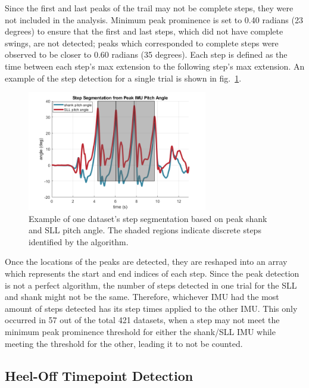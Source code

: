 \documentclass[defaultstyle,11pt]{comps}
\begin{document}
Since the first and last peaks of the trail may not be complete steps, they were not included in the analysis.
Minimum peak prominence is set to 0.40 radians (23 degrees) to ensure that the first and last steps, which did not have complete swings, are not detected; peaks which corresponded to complete steps were observed to be closer to 0.60 radians (35 degrees).
Each step is defined as the time between each step's max extension to the following step's max extension.
An example of the step detection for a single trial is shown in fig.~\ref{fig:SA1-Steps}.

\begin{figure}
\hypertarget{fig:SA1-Steps}{%
\centering
\includegraphics[width=0.7\textwidth,height=\textheight]{../fig/SA1/S3C1T1R_StepSeg.png}
\caption{Example of one dataset's step segmentation based on peak shank and SLL pitch angle. The shaded regions indicate discrete steps identified by the algorithm.}\label{fig:SA1-Steps}
}
\end{figure}

Once the locations of the peaks are detected, they are reshaped into an array which represents the start and end indices of each step.
Since the peak detection is not a perfect algorithm, the number of steps detected in one trial for the SLL and shank might not be the same.
Therefore, whichever IMU had the most amount of steps detected has its step times applied to the other IMU.
This only occurred in 57 out of the total 421 datasets, when a step may not meet the minimum peak prominence threshold for either the shank/SLL IMU while meeting the threshold for the other, leading it to not be counted.

\hypertarget{heel-off-timepoint-detection}{%
\subsection{Heel-Off Timepoint Detection}\label{heel-off-timepoint-detection}}
\end{document}
